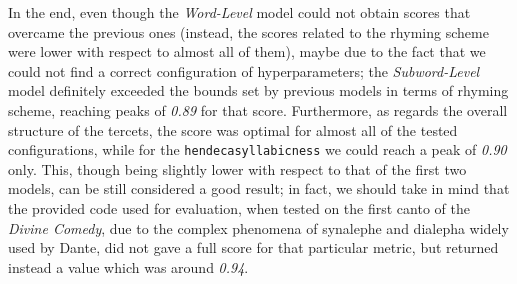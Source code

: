 In the end, even though the \textit{Word-Level} model could not obtain scores that overcame the previous ones (instead, the scores related to the rhyming scheme were lower with respect to almost all of them), maybe due to the fact that we could not find a correct configuration of hyperparameters; the \textit{Subword-Level} model definitely exceeded the bounds set by previous models in terms of rhyming scheme, reaching peaks of \textit{0.89} for that score.
Furthermore, as regards the overall structure of the tercets, the score was optimal for almost all of the tested configurations, while for the \texttt{hendecasyllabicness} we could reach a peak of \textit{0.90} only.
This, though being slightly lower with respect to that of the first two models, can be still considered a good result; in fact, we should take in mind that the provided code used for evaluation, when tested on the first canto of the \textit{Divine Comedy}, due to the complex phenomena of synalephe and dialepha widely used by Dante, did not gave a full score for that particular metric, but returned instead a value which was around \textit{0.94}.